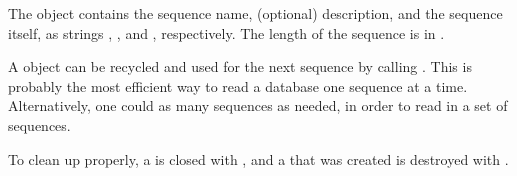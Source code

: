 The  object contains the sequence name, (optional)
description, and the sequence itself, as strings ,
, and , respectively. The length of the
sequence is in .

A  object can be recycled and used for the next
sequence by calling . This is probably the
most efficient way to read a database one sequence at a
time. Alternatively, one could  as many
sequences as needed, in order to read in a set of sequences.

To clean up properly, a  is closed with
, and a  that was created
is destroyed with .

